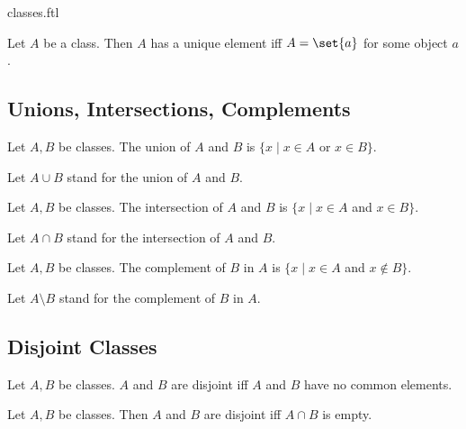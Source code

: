 \documentclass{naproche-library}
\begin{document}
\begin{smodule}{classes.ftl}
  \begin{proposition}[forthel,id=FOUNDATIONS_01_0166348647163481]
    Let $A$ be a class.
    Then $A$ has a unique element iff $A = \set{a}$ for some object $a$.
  \end{proposition}


  \subsection*{Unions, Intersections, Complements}

  \begin{definition}[forthel,id=FOUNDATIONS_01_2159753924968448]
    Let $A, B$ be classes.
    The union of $A$ and $B$ is $\{ x \mid x \in A$ or $x \in B \}$.

    Let $A \cup B$ stand for the union of $A$ and $B$.
  \end{definition}

  \begin{definition}[forthel,id=FOUNDATIONS_01_5744033011859456]
    Let $A, B$ be classes.
    The intersection of $A$ and $B$ is $\{ x \mid x \in A$ and $x \in B \}$.

    Let $A \cap B$ stand for the intersection of $A$ and $B$.
  \end{definition}

  \begin{definition}[forthel,id=FOUNDATIONS_01_7620345041256448]
    Let $A, B$ be classes.
    The complement of $B$ in $A$ is $\{ x \mid x \in A$ and $x \notin B \}$.

    Let $A \setminus B$ stand for the complement of $B$ in $A$.
  \end{definition}


  \subsection*{Disjoint Classes}

  \begin{definition}[forthel,id=FOUNDATIONS_01_4981913324355584]
    Let $A, B$ be classes.
    $A$ and $B$ are disjoint iff $A$ and $B$ have no common elements.
  \end{definition}

  \begin{proposition}[forthel,id=FOUNDATIONS_01_1211191546347520]
    Let $A, B$ be classes.
    Then $A$ and $B$ are disjoint iff $A \cap B$ is empty.
  \end{proposition}
\end{smodule}
\end{document}
